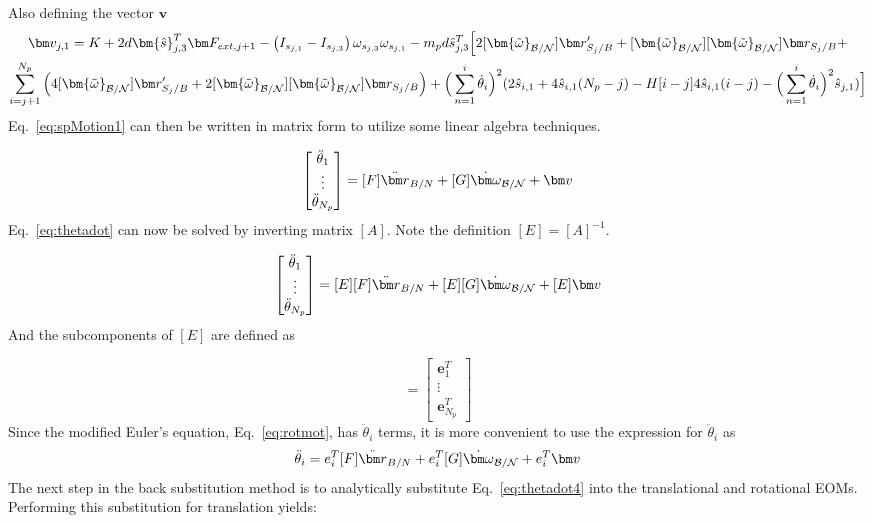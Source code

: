 \documentclass[paper]{aiaaNew}
\begin{document}
Also defining the vector $\bm v$ 
\begin{multline}
    \bm v_{j,1} =  K + 2d\bm{\hat{s}}^{T}_{j,3}\bm F_{ext,j+1} - \left( I_{s_{j,1}} - I_{s_{j,3}}\right) \omega_{s_{j,3}} \omega_{s_{j,1}} - m_p d \hat{s}^{T}_{j,3}\Big[2[\bm{\tilde{\omega}}_{\cal B/N}]\bm r'_{S_{j}/B} + [\bm{\tilde{\omega}}_{\cal B/N}][\bm{\tilde{\omega}}_{\cal B/N}]\bm r_{S_{j}/B}+\\
    \sum^{N_p}_{i=j+1}\Big(4[\bm{\tilde{\omega}}_{\cal B/N}]\bm r'_{S_{j}/B} + 2[\bm{\tilde{\omega}}_{\cal B/N}][\bm{\tilde{\omega}}_{\cal B/N}]\bm r_{S_{j}/B} \Big) + \Big( \sum^{i}_{n=1} \dot{\theta}_i \Big)^2 (2\hat{s}_{i,1}+4\hat{s}_{i,1}(N_p-j) -H[i-j] 4\hat{s}_{i,1}(i-j) - \Big( \sum^{i}_{n=1} \dot{\theta}_i\Big)^2 \hat{s}_{j,1} )\Big]
\end{multline}
Eq.~\eqref{eq:spMotion1} can then be written in matrix form to utilize some linear algebra techniques.

\begin{equation}
[A]\begin{bmatrix}
\ddot \theta_{1}\\
\vdots \\
\ddot \theta_{N_p}
\end{bmatrix}
= [F] \ddot{\bm r}_{B/N} + [G]\dot{\bm\omega}_{\cal B/N} + \bm v
\label{eq:thetadot}
\end{equation}
Eq.~\eqref{eq:thetadot} can now be solved by inverting matrix $[A]$. Note the definition $[E] = [A]^{-1}$.

\begin{equation}
\begin{bmatrix}
\ddot \theta_{1}\\
\vdots \\
\ddot \theta_{N_p}
\end{bmatrix}
= [E][F] \ddot{\bm r}_{B/N} + [E][G]\dot{\bm\omega}_{\cal B/N} + [E]\bm v
\label{eq:thetadot2}
\end{equation}
And the subcomponents of $[E]$ are defined as

\begin{equation}
[E] = \begin{bmatrix}
\bm e_{1}^T\\
\vdots \\
\bm e_{N_p}^T
\end{bmatrix}
\label{eq:E}
\end{equation}
Since the modified Euler's equation, Eq.~\eqref{eq:rotmot}, has $\ddot \theta_{i}$ terms, it is more convenient to use the expression for $\ddot \theta_i$ as
\begin{equation}
\ddot \theta_{i}
= e_{i}^T[F] \ddot{\bm r}_{B/N} + e_{i}^T[G]\dot{\bm\omega}_{\cal B/N} + e_{i}^T\bm v
\label{eq:thetadot4}
\end{equation}
The next step in the back substitution method is to analytically substitute Eq.~\eqref{eq:thetadot4} into the translational and rotational EOMs. Performing this substitution for translation yields:
\end{document}
